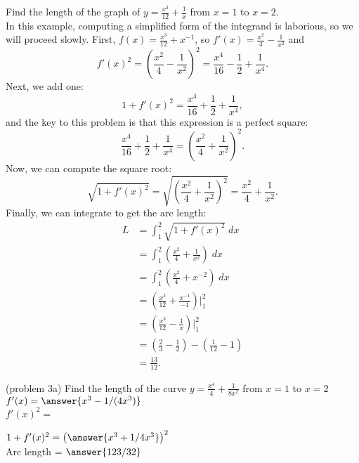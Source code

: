 \documentclass{ximera}
\begin{document}
\begin{example}[example 3] Find the length of the graph of 
$y = \frac{x^3}{12} + \frac{1}{x}$ from $x = 1$ to $x = 2$.\\
In this example, computing a simplified form of the integrand is laborious, so we will proceed slowly.
First, $f(x) = \frac{x^3}{12} + x^{-1}$, so $f'(x) = \frac{x^2}{4} - \frac{1}{x^2}$ and
\[
f'(x)^2 = \left( \frac{x^2}{4} - \frac{1}{x^2} \right)^2 = \frac{x^4}{16} - \frac12 + \frac{1}{x^4}.
\]
Next, we add one:
\[
1 + f'(x)^2 = \frac{x^4}{16} + \frac12 + \frac{1}{x^4},
\]
and the key to this problem is that this expression is a perfect square:
\[
\frac{x^4}{16} + \frac12 + \frac{1}{x^4} = \left( \frac{x^2}{4} + \frac{1}{x^2}\right)^2.
\]
Now, we can compute the square root:
\[
\sqrt{1+f'(x)^2} = \sqrt{\left( \frac{x^2}{4} + \frac{1}{x^2}\right)^2 } = \frac{x^2}{4} + \frac{1}{x^2}.
\]
Finally, we can integrate to get the arc length:
\begin{align*}
L &= \int_1^2 \sqrt{1+f'(x)^2} \; dx \\
  &= \int_1^2 \left(\frac{x^2}{4} + \frac{1}{x^2} \right) \; dx  \\
  &= \int_1^2 \left(\frac{x^2}{4} + x^{-2} \right) \; dx \\
  &= \left(\frac{x^3}{12} + \frac{x^{-1}}{-1} \right) \bigg|_1^2 \\
  &= \left(\frac{x^3}{12} - \frac{1}{x} \right) \bigg|_1^2 \\
  &= \left(\frac23 - \frac12\right) - \left(\frac{1}{12} - 1\right) \\
  &= \frac{13}{12}.  
\end{align*}
\end{example}




\begin{problem}(problem 3a)
Find the length of the curve $\displaystyle{y = \frac{x^4}{4} + \frac{1}{8x^2}}$ from $x = 1$ to $x = 2$\\

$f'(x) = \answer{x^3 - 1/(4x^3)}$\\

$f'(x)^2 =$

\begin{multipleChoice}
\end{multipleChoice}

$1+f'(x)^2 = \left(\answer{x^3 + 1/4x^3}\right)^2$\\

Arc length = $\answer{123/32}$
\end{problem}
\end{document}

